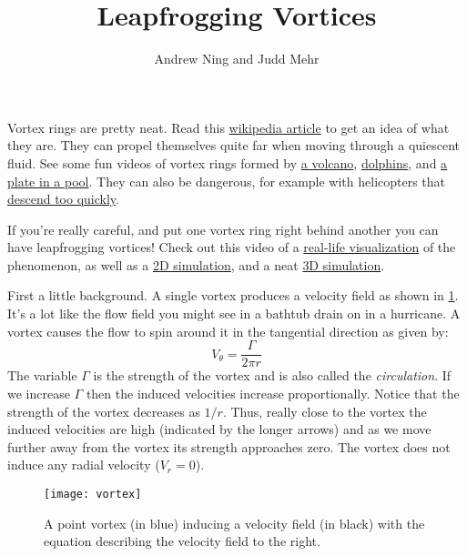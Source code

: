 \documentclass{article}
\begin{document}
\author{Andrew Ning and Judd Mehr}
\title{Leapfrogging Vortices}
\date{}  %
\maketitle

Vortex rings are pretty neat.  Read this \href{https://en.wikipedia.org/wiki/Vortex_ring}{wikipedia article} to get an idea of what they are.  They can propel themselves quite far when moving through a quiescent fluid.  See some fun videos of vortex rings formed by \href{https://www.youtube.com/watch?v=VbV98Z0QP-k}{a volcano}, \href{https://www.youtube.com/watch?v=ks3aQhEohTE}{dolphins}, and  \href{https://www.youtube.com/watch?v=72LWr7BU8Ao}{a plate in a pool}.  They can also be dangerous, for example with helicopters that \href{https://youtu.be/wddpsnvu0PM?t=75}{descend too quickly}.

If you're really careful, and put one vortex ring right behind another you can have leapfrogging vortices!  Check out this video of a \href{https://youtu.be/Yydb9Mqg9TY}{real-life visualization} of the phenomenon, as well as a \href{https://youtu.be/0LP-MgrXtIM}{2D simulation}, and a neat \href{https://www.youtube.com/watch?v=SPBMEXX5xBI}{3D simulation}.

First a little background.  A single vortex produces a velocity field as shown in \cref{fig:vortex}.  It's a lot like the flow field you might see in a bathtub drain on in a hurricane.  A vortex causes the flow to spin around it in the tangential direction as given by:
\begin{equation}
V_\theta = \frac{\Gamma}{2 \pi r}
\end{equation}
The variable $\Gamma$ is the strength of the vortex and is also called the \emph{circulation}.  If we increase $\Gamma$ then the induced velocities increase proportionally.  Notice that the strength of the vortex decreases as $1/r$.  Thus, really close to the vortex the induced velocities are high (indicated by the longer arrows) and as we move further away from the vortex its strength approaches zero.  The vortex does not induce any radial velocity ($V_r = 0$).

\begin{figure}[htb]
\centering
\texttt{[image: vortex]}
\caption{A point vortex (in blue) inducing a velocity field (in black) with the equation describing the velocity field to the right.}
\label{fig:vortex}
\end{figure}
\end{document}
